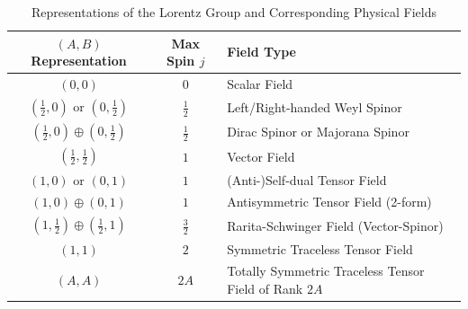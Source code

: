 \begin{table}[htbp]
    \centering
    \renewcommand{\arraystretch}{1.4}
    \caption{Representations of the Lorentz Group and Corresponding Physical Fields}
    \vspace{0.2cm}
    \begin{tabular}{c c l}
        \toprule
        \textbf{$(A,B)$ Representation} & \textbf{Max Spin $j$} & \textbf{Field Type} \\
        \midrule
        $(0, 0)$ & $0$ & Scalar Field \\
        
        $(\frac{1}{2}, 0)$ or $(0, \frac{1}{2})$ & $\frac{1}{2}$ & Left/Right-handed Weyl Spinor \\
        
        $(\frac{1}{2}, 0) \oplus (0, \frac{1}{2})$ & $\frac{1}{2}$ & Dirac Spinor or  Majorana Spinor \\
        
        $(\frac{1}{2}, \frac{1}{2})$ & $1$ & Vector Field \\
        
        $(1, 0)$ or $(0, 1)$ & $1$ & (Anti-)Self-dual Tensor Field \\
        
        $(1, 0) \oplus (0, 1)$ & $1$ & Antisymmetric Tensor Field (2-form) \\
        
        $(1, \frac{1}{2}) \oplus (\frac{1}{2}, 1)$ & $\frac{3}{2}$ & Rarita-Schwinger Field (Vector-Spinor) \\
        
        $(1, 1)$ & $2$ & Symmetric Traceless Tensor Field \\
        \midrule
        $(A, A)$ & $2A$ & Totally Symmetric Traceless Tensor Field of Rank $2A$ \\
        \bottomrule
    \end{tabular}
    \label{tab:fields_representation_english}
\end{table}
